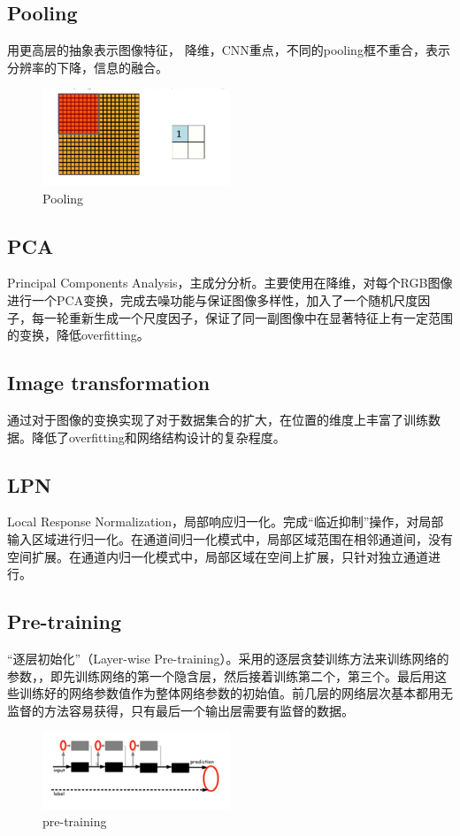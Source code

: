\documentclass[12pt]{article}
\begin{document}
\subsection{Pooling}

用更高层的抽象表示图像特征， 降维，CNN重点，不同的pooling框不重合，表示分辨率的下降，信息的融合。
\begin{figure}[!ht]
\centering
\includegraphics[width=0.5\textwidth]{pooling}
\caption{Pooling}
\end{figure}

\subsection{PCA}
Principal Components Analysis，主成分分析。主要使用在降维，对每个RGB图像进行一个PCA变换，完成去噪功能与保证图像多样性，加入了一个随机尺度因子，每一轮重新生成一个尺度因子，保证了同一副图像中在显著特征上有一定范围的变换，降低overfitting。

\subsection{Image transformation}
通过对于图像的变换实现了对于数据集合的扩大，在位置的维度上丰富了训练数据。降低了overfitting和网络结构设计的复杂程度。

\subsection{LPN}
Local Response Normalization，局部响应归一化。完成“临近抑制”操作，对局部输入区域进行归一化。在通道间归一化模式中，局部区域范围在相邻通道间，没有空间扩展。在通道内归一化模式中，局部区域在空间上扩展，只针对独立通道进行。

\subsection{Pre-training}
``逐层初始化''（Layer-wise Pre-training）。采用的逐层贪婪训练方法来训练网络的参数，，即先训练网络的第一个隐含层，然后接着训练第二个，第三个。最后用这些训练好的网络参数值作为整体网络参数的初始值。前几层的网络层次基本都用无监督的方法容易获得，只有最后一个输出层需要有监督的数据。
\begin{figure}[!ht]
\centering
\includegraphics[width=0.5\textwidth]{pre-training}
\caption{pre-training}
\end{figure}
\end{document}
